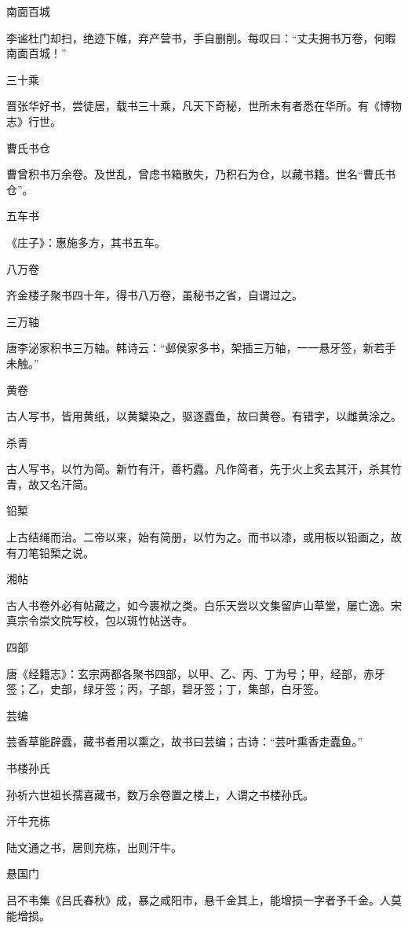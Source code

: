 \documentclass[a4paper,12pt,UTF8,twoside]{ctexbook}
\begin{document}
    南面百城
    
    李谧杜门却扫，绝迹下帷，弃产营书，手自删削。每叹曰：“丈夫拥书万卷，何暇南面百城！”
    
    三十乘
    
    晋张华好书，尝徒居，载书三十乘，凡天下奇秘，世所未有者悉在华所。有《博物志》行世。
    
    曹氏书仓
    
    曹曾积书万余卷。及世乱，曾虑书箱散失，乃积石为仓，以藏书籍。世名“曹氏书仓”。
    
    五车书
    
    《庄子》：惠施多方，其书五车。
    
    八万卷
    
    齐金楼子聚书四十年，得书八万卷，虽秘书之省，自谓过之。
    
    三万轴
    
    唐李泌家积书三万轴。韩诗云：“邺侯家多书，架插三万轴，一一悬牙签，新若手未触。”
    
    黄卷
    
    古人写书，皆用黄纸，以黄櫱染之，驱逐蠹鱼，故曰黄卷。有错字，以雌黄涂之。
    
    杀青
    
    古人写书，以竹为简。新竹有汗，善朽蠹。凡作简者，先于火上炙去其汗，杀其竹青，故又名汗简。
    
    铅椠
    
    上古结绳而治。二帝以来，始有简册，以竹为之。而书以漆，或用板以铅画之，故有刀笔铅椠之说。
    
    湘帖
    
    古人书卷外必有帖藏之，如今裹袱之类。白乐天尝以文集留庐山草堂，屡亡逸。宋真宗令崇文院写校，包以斑竹帖送寺。
    
    四部
    
    唐《经籍志》：玄宗两都各聚书四部，以甲、乙、丙、丁为号；甲，经部，赤牙签；乙，史部，绿牙签；丙，子部，碧牙签；丁，集部，白牙签。
    
    芸编
    
    芸香草能辟蠹，藏书者用以熏之，故书曰芸编；古诗：“芸叶熏香走蠹鱼。”
    
    书楼孙氏
    
    孙祈六世祖长孺喜藏书，数万余卷置之楼上，人谓之书楼孙氏。
    
    汗牛充栋
    
    陆文通之书，居则充栋，出则汗牛。
    
    悬国门
    
    吕不韦集《吕氏春秋》成，暴之咸阳市，悬千金其上，能增损一字者予千金。人莫能增损。
    
\end{document}

